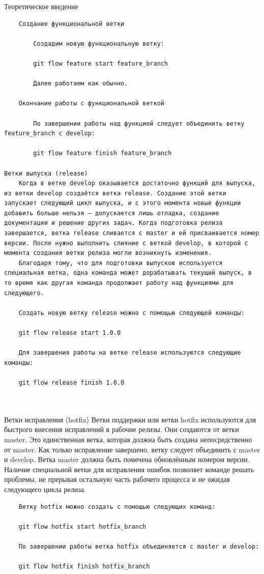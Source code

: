 \documentclass[
  ignorenonframetext,
  aspectratio=169,
  russian,
]{beamer}
\begin{document}
\begin{frame}[fragile]{Теоретическое введение}
\begin{verbatim}
    Создание функциональной ветки

        Создадим новую функциональную ветку:

        git flow feature start feature_branch

        Далее работаем как обычно.

    Окончание работы с функциональной веткой

        По завершении работы над функцией следует объединить ветку feature_branch с develop:

        git flow feature finish feature_branch

Ветки выпуска (release)
    Когда в ветке develop оказывается достаточно функций для выпуска, из ветки develop создаётся ветка release. Создание этой ветки запускает следующий цикл выпуска, и с этого момента новые функции добавить больше нельзя — допускается лишь отладка, создание документации и решение других задач. Когда подготовка релиза завершается, ветка release сливается с master и ей присваивается номер версии. После нужно выполнить слияние с веткой develop, в которой с момента создания ветки релиза могли возникнуть изменения.
    Благодаря тому, что для подготовки выпусков используется специальная ветка, одна команда может дорабатывать текущий выпуск, в то время как другая команда продолжает работу над функциями для следующего.

    Создать новую ветку release можно с помощью следующей команды:

    git flow release start 1.0.0

    Для завершения работы на ветке release используются следующие команды:

    git flow release finish 1.0.0
    
    
\end{verbatim}

Ветки исправления (hotfix) Ветки поддержки или ветки hotfix используются
для быстрого внесения исправлений в рабочие релизы. Они создаются от
ветки master. Это единственная ветка, которая должна быть создана
непосредственно от master. Как только исправление завершено, ветку
следует объединить с master и develop. Ветка master должна быть помечена
обновлённым номером версии. Наличие специальной ветки для исправления
ошибок позволяет команде решать проблемы, не прерывая остальную часть
рабочего процесса и не ожидая следующего цикла релиза.

\begin{verbatim}
    Ветку hotfix можно создать с помощью следующих команд:

    git flow hotfix start hotfix_branch

    По завершении работы ветка hotfix объединяется с master и develop:

    git flow hotfix finish hotfix_branch
    
\end{verbatim}
\end{frame}
\end{document}
